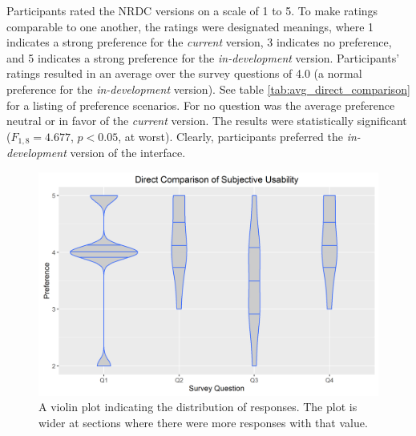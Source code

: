\documentclass{acm_proc_article-sp}
\begin{document}
Participants rated the NRDC versions on a scale of 1 to 5. To make ratings comparable to one another, the ratings were designated meanings, where 1 indicates a strong preference for the \emph{current} version, 3 indicates no preference, and 5 indicates a strong preference for the \emph{in-development} version. Participants' ratings resulted in an average over the survey questions of 4.0 (a normal preference for the \emph{in-development} version). See table \ref{tab:avg_direct_comparison} for a listing of preference scenarios. For no question was the average preference neutral or in favor of the \emph{current} version. The results were statistically significant ($F_{1,8} = 4.677$, $p < 0.05$, at worst). Clearly, participants preferred the \emph{in-development} version of the interface.

\begin{figure}[h!]
  \centering
  \includegraphics[width=.8\linewidth]{direct_comparison_violin}
  \caption{A violin plot indicating the distribution of responses. The plot is wider at sections where there were more responses with that value.}
  \label{fig:subjective_direct}
\end{figure}

%
\end{document}
